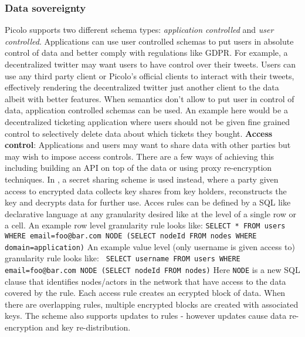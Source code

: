 \subsubsection{Data sovereignty} \label{sec:access_control}
\textsf{Picolo} supports two different schema types: \textit{application controlled} and \textit{user controlled}. Applications can use user controlled schemas to put users in absolute control of data and better comply with regulations like GDPR. For example, a decentralized twitter may  want users to have control over their tweets. Users can use any third party client or \textsf{Picolo}'s official clients to interact with their tweets, effectively rendering the decentralized twitter just another client to the data albeit with better features. \newline\newline
When semantics don't allow to put user in control of data, application controlled schemas can be used. An example here would be a decentralized ticketing application where users should not be given fine grained control to selectively delete data about which tickets they bought.
\newline\newline
\textbf{Access control}:
Applications and users may want to share data with other parties but may wish to impose access controls. There are a few ways of achieving this including building an API on top of the data or using proxy re-encryption techniques. In \cite{ac_p2p_db}, a secret sharing scheme is used instead, where a party given access to encrypted data collects key shares from key holders, reconstructs the key and decrypts data for further use. Acces rules can be defined by a SQL like declarative language at any granularity desired like at the level of a single row or a cell. An example row level granularity rule looks like:\newline \newline
\texttt{SELECT  * \newline FROM users \newline WHERE email=foo@bar.com \newline NODE (SELECT nodeId FROM nodes WHERE domain=application)} \newline \newline
An example value level (only username is given access to) granularity rule looks like:\newline \newline
\texttt{ SELECT username \newline FROM users \newline WHERE email=foo@bar.com \newline NODE (SELECT nodeId FROM nodes)}\newline\newline
Here \texttt{NODE} is a new SQL clause that identifies nodes/actors in the network that have access to the data covered by the rule. Each access rule creates an ecrypted block of data. When there are overlapping rules, multiple encrypted blocks are created with associated keys. The scheme also supports updates to rules - however updates cause data re-encryption and key re-distribution. 

